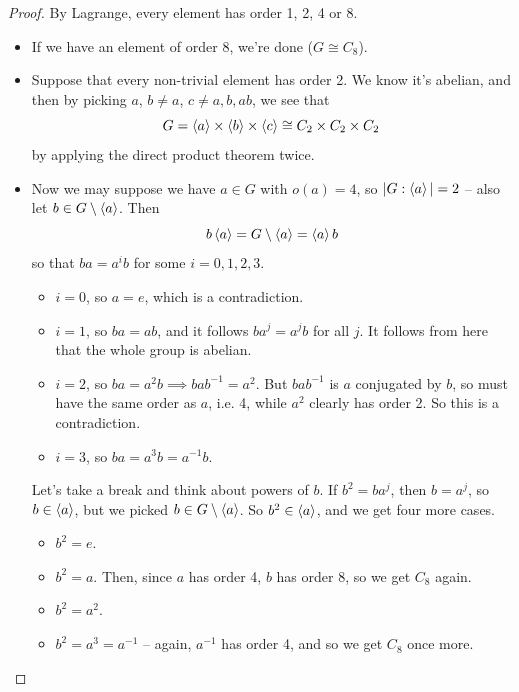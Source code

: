 \documentclass{../../template/note}
\begin{document}
    \begin{proof}
        By Lagrange, every element has order 1, 2, 4 or 8.
        \begin{itemize}
            \item If we have an element of order 8, we're done (\(G \cong C_8\)).
            \item Suppose that every non-trivial element has order 2. We know it's abelian, and then by picking \(a\), \(b \neq a\), \(c \neq a, b, ab\), we see that
            \[
                G = \left \langle a \right \rangle \times \left \langle b \right \rangle \times \left \langle c \right \rangle \cong C_2 \times C_2 \times C_2
            \]
            by applying the direct product theorem twice.
            \item Now we may suppose we have \(a \in G\) with \(o(a) = 4\), so \(|G: \left \langle a \right \rangle| = 2\) -- also let \(b \in G \setminus \left \langle a \right \rangle\). Then
            \[
                b \left \langle a \right \rangle = G \setminus \left \langle a \right \rangle = \left \langle a \right \rangle b
            \]
            so that \(ba = a^ib\) for some \(i = 0, 1, 2, 3\).
            \begin{itemize}
                \item \(i = 0\), so \(a = e\), which is a contradiction.
                \item \(i = 1\), so \(ba = ab\), and it follows \(ba^j = a^jb\) for all \(j\). It follows from here that the whole group is abelian.
                \item \(i = 2\), so \(ba = a^2b \implies bab^{-1} = a^2\). But \(bab^{-1}\) is \(a\) conjugated by \(b\), so must have the same order as \(a\), i.e. 4, while \(a^2\) clearly has order 2. So this is a contradiction.
                \item \(i = 3\), so \(ba = a^3 b = a^{-1} b\).
            \end{itemize}
            Let's take a break and think about powers of \(b\). If \(b^2 = ba^j\), then \(b = a^j\), so \(b \in \left \langle a \right \rangle\), but we picked \(b \in G \setminus \left \langle a \right \rangle\). So \(b^2 \in \left \langle a \right \rangle\), and we get four more cases.
            \begin{itemize}
                \item \(b^2 = e\).
                \item \(b^2 = a\). Then, since \(a\) has order 4, \(b\) has order 8, so we get \(C_8\) again.
                \item \(b^2 = a^2\).
                \item \(b^2 = a^3 = a^{-1}\) -- again, \(a^{-1}\) has order 4, and so we get \(C_8\) once more.
            \end{itemize}

\end{itemize}
\end{proof}
\end{document}
